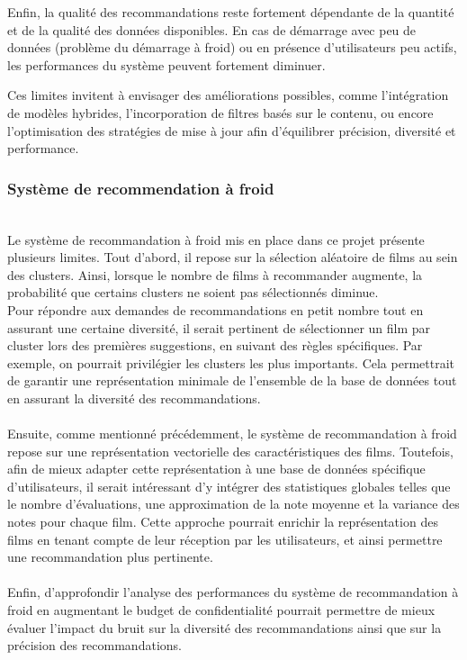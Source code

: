 \documentclass{article}
\begin{document}
Enfin, la qualité des recommandations reste fortement dépendante de la quantité et de la qualité des données disponibles. En cas de démarrage avec peu de données (problème du démarrage à froid) ou en présence d’utilisateurs peu actifs, les performances du système peuvent fortement diminuer.

Ces limites invitent à envisager des améliorations possibles, comme l’intégration de modèles hybrides, l’incorporation de filtres basés sur le contenu, ou encore l’optimisation des stratégies de mise à jour afin d’équilibrer précision, diversité et performance.


\subsubsection{Système de recommendation à froid}
$ $\\
Le système de recommandation à froid mis en place dans ce projet présente plusieurs limites.
Tout d’abord, il repose sur la sélection aléatoire de films au sein des clusters. Ainsi, lorsque
le nombre de films à recommander augmente, la probabilité que certains clusters ne soient pas sélectionnés diminue.\\
Pour répondre aux demandes de recommandations en petit nombre tout en assurant une certaine diversité, il serait pertinent
de sélectionner un film par cluster lors des premières suggestions, en suivant des règles spécifiques. Par exemple, on
pourrait privilégier les clusters les plus importants. Cela permettrait de garantir une représentation minimale de l’ensemble
de la base de données tout en assurant la diversité des recommandations.\\
\\
Ensuite, comme mentionné précédemment, le système de recommandation à froid repose sur une représentation
vectorielle des caractéristiques des films. Toutefois, afin de mieux adapter cette représentation
à une base de données spécifique d’utilisateurs, il serait intéressant d’y intégrer des
statistiques globales telles que le nombre d’évaluations, une approximation de la note moyenne
et la variance des notes pour chaque film. Cette approche pourrait enrichir la représentation
des films en tenant compte de leur réception par les utilisateurs, et ainsi permettre une recommandation plus pertinente.\\
\\
Enfin, d'approfondir l'analyse des performances du système de recommandation à froid en augmentant le budget de confidentialité
pourrait permettre de mieux évaluer l'impact du bruit sur la diversité des recommandations ainsi que sur la précision des recommandations.
\end{document}
